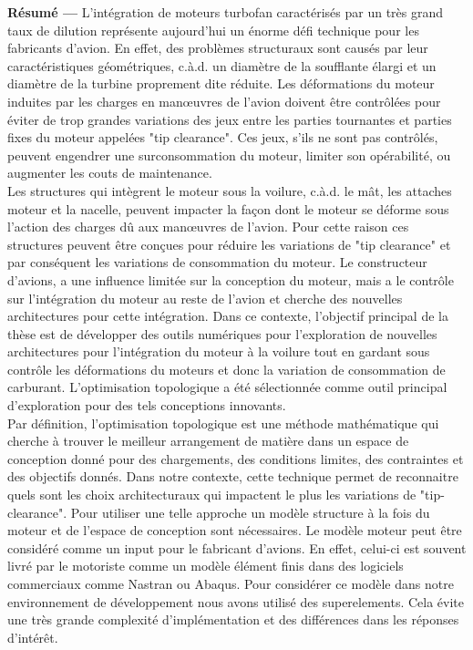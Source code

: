 
{\large\textbf{Résumé ---}}
L'intégration de moteurs turbofan caractérisés par un très grand taux de dilution représente aujourd'hui un énorme défi technique pour les fabricants d'avion. En effet, des problèmes structuraux sont causés par leur caractéristiques géométriques, c.à.d. un diamètre de la soufflante élargi et un diamètre de la turbine proprement dite réduite. Les déformations du moteur induites par les charges en manœuvres de l'avion doivent être contrôlées pour éviter de trop grandes variations des jeux entre les parties tournantes et parties fixes du moteur appelées "tip clearance".  Ces jeux, s'ils ne sont pas contrôlés, peuvent engendrer une surconsommation du moteur, limiter son opérabilité, ou augmenter les couts de maintenance.\\
Les structures qui intègrent le moteur sous la voilure,  c.à.d. le mât, les attaches moteur et la nacelle, peuvent impacter la façon dont le moteur se déforme sous l'action des charges dû aux manœuvres de l'avion. Pour cette raison ces structures peuvent être conçues pour réduire les variations de "tip clearance" et par conséquent les variations de consommation du moteur. Le constructeur d'avions, a une influence limitée sur la conception du moteur, mais a le contrôle sur l'intégration du moteur au reste de l'avion et cherche des nouvelles architectures pour cette intégration.
Dans ce contexte, l'objectif principal de la thèse est de développer des outils numériques pour l'exploration de nouvelles architectures pour l'intégration du moteur à la voilure tout en gardant sous contrôle les déformations du moteurs et donc la variation de consommation de carburant.  L'optimisation topologique a été sélectionnée comme outil principal d'exploration pour des tels conceptions innovants. \\
Par définition, l’optimisation topologique est une méthode mathématique qui  cherche à trouver le meilleur arrangement de matière dans un espace de conception donné pour des chargements, des conditions limites, des contraintes et des objectifs donnés. Dans notre contexte, cette technique permet de reconnaitre quels sont les choix architecturaux qui impactent le plus les variations de "tip-clearance".
Pour utiliser une telle approche un modèle structure à la fois du moteur et de l'espace de conception sont nécessaires.
Le modèle moteur peut être considéré comme un input pour le fabricant d'avions. En effet, celui-ci est souvent livré par le motoriste comme un modèle élément finis dans des logiciels commerciaux comme Nastran ou Abaqus. Pour considérer ce modèle dans notre environnement de développement nous avons utilisé des superelements. Cela évite une très grande complexité d'implémentation et des différences dans les réponses d'intérêt. 
